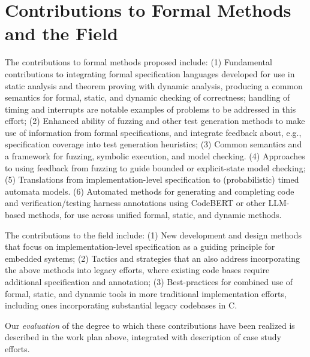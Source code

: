 \section{Contributions to Formal Methods and the Field}

The contributions to formal methods proposed include: (1)
Fundamental contributions to integrating formal specification
languages developed for use in static analysis and theorem proving
with dynamic analysis, producing a common semantics for formal,
static, and dynamic checking of correctness; handling of timing and
interrupts are notable examples of problems to be addressed in this effort;
(2) Enhanced ability of fuzzing and other test generation methods to
make use of information from formal specifications, and integrate
feedback about, e.g., specification coverage into test generation
heuristics;
(3) Common semantics and a framework for fuzzing, symbolic execution,
and model checking.
(4) Approaches to using feedback from fuzzing to guide bounded or explicit-state model
checking;
(5) Translations from implementation-level specification to
(probabilistic) timed automata models.
(6) Automated methods for generating and completing code and
verification/testing harness annotations using CodeBERT or other
LLM-based methods, for use across unified formal, static, and dynamic methods.

The contributions to the field include:
(1)  New development and design methods that focus on
implementation-level specification as a guiding
principle for embedded systems; (2) Tactics and strategies that an
also address incorporating the above methods into
legacy efforts, where existing code bases require additional
specification and annotation; (3) Best-practices for combined use of formal, static, and dynamic tools in
more traditional implementation efforts, including ones incorporating
substantial legacy codebases in C.


Our \emph{evaluation} of the degree to which these contributions have
been realized is described in the work plan above, integrated with
description of case study efforts.